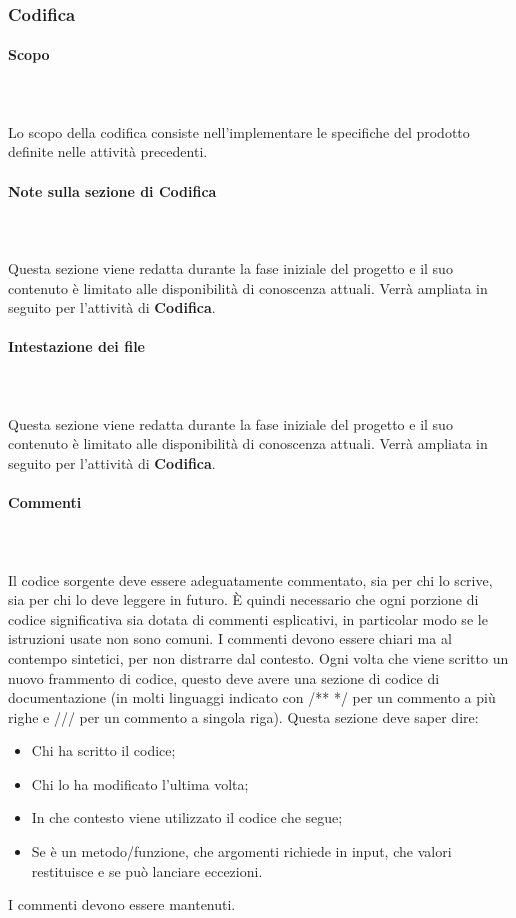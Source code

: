 \subsubsection{Codifica}
\paragraph{Scopo}\mbox{}\\ \\
Lo scopo della codifica consiste nell'implementare le specifiche del prodotto definite nelle attività precedenti.

\paragraph{Note sulla sezione di Codifica}\mbox{}\\ \\
Questa sezione viene redatta durante la fase iniziale del progetto e il suo contenuto è limitato alle disponibilità di conoscenza attuali.
Verrà ampliata in seguito per l'attività di \textbf{Codifica}.

\paragraph{Intestazione dei file}\mbox{}\\ \\
Questa sezione viene redatta durante la fase iniziale del progetto e il suo contenuto è limitato alle disponibilità di conoscenza attuali.
Verrà ampliata in seguito per l'attività di \textbf{Codifica}.

\paragraph{Commenti}\mbox{}\\ \\
Il codice sorgente deve essere adeguatamente commentato, sia per chi lo scrive, sia per chi lo deve leggere in futuro.
È quindi necessario che ogni porzione di codice significativa sia dotata di commenti esplicativi, in particolar modo se le istruzioni usate non sono comuni.
I commenti devono essere chiari ma al contempo sintetici, per non distrarre dal contesto.
Ogni volta che viene scritto un nuovo frammento di codice, questo deve avere una sezione di codice di documentazione (in molti linguaggi indicato con /** */ per un commento a più righe e /// per un commento a singola riga).
Questa sezione deve saper dire:
\begin{itemize}
    \item Chi ha scritto il codice;
    \item Chi lo ha modificato l'ultima volta;
    \item In che contesto viene utilizzato il codice che segue;
    \item Se è un metodo/funzione, che argomenti richiede in input, che valori restituisce e se può lanciare eccezioni.
\end{itemize}
I commenti devono essere mantenuti.

